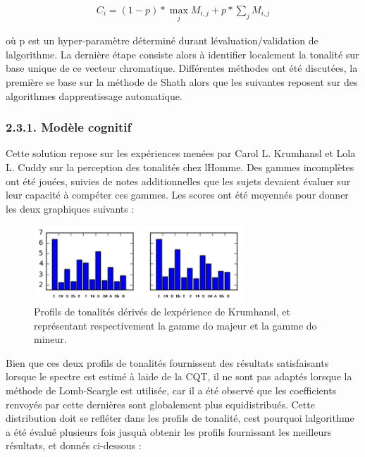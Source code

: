 \documentclass[letterpaper]{article}
\begin{document}
\begin{align}
C_{i} = (1 - p) * \max_{j} M_{i, j} + p * \sum_{j} M_{i, j}
\end{align}

où p est un hyper-paramètre déterminé durant l\textquotesingle évaluation/validation de l\textquotesingle algorithme. La dernière étape consiste alors à identifier localement la tonalité sur base unique de ce vecteur chromatique. Différentes méthodes ont été discutées, la première se base sur la méthode de
Sh\textquotesingle ath alors que les suivantes reposent sur des algorithmes d\textquotesingle apprentissage automatique.

\subsubsection*{2.3.1. Modèle cognitif}

Cette solution repose sur les expériences menées par Carol L. Krumhansl et Lola L. Cuddy sur la perception des tonalités chez l\textquotesingle Homme.
Des gammes incomplètes ont été jouées, suivies de notes additionnelles que les sujets devaient évaluer sur leur capacité à compéter ces gammes. 
Les scores ont été moyennés pour donner les deux graphiques suivants :

\FloatBarrier

\begin{figure}[h!]
\begin{center}
\includegraphics[width=3.1in,angle=0]{imgs/Krumhansl.png}
\caption{Profils de tonalités dérivés de l\textquotesingle expérience de Krumhansl, et représentant respectivement la gamme do majeur
et la gamme do mineur.}
\label{fig1}
\end{center}
\end{figure}

Bien que ces deux profils de tonalités fournissent des résultats satisfaisants lorsque le spectre est estimé à l\textquotesingle aide de la CQT, il ne sont pas adaptés lorsque la méthode de Lomb-Scargle est utilisée, car il a été observé que les coefficients renvoyés par cette dernières sont globalement plus equidistribués. Cette distribution doit se refléter dans les profils de tonalité, c\textquotesingle est pourquoi l\textquotesingle algorithme a été évalué plusieurs fois jusqu\textquotesingle à obtenir les profils fournissant les meilleurs résultats, et donnés ci-dessous :
\end{document}
